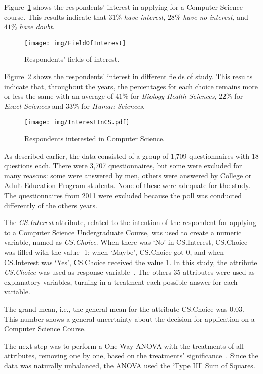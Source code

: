Figure~\ref{fig:FieldOfInterest} shows the respondents' interest in applying for a Computer Science course. This results indicate that $31\%$  \emph{have interest}, $28\%$  \emph{have no interest}, and $41\%$  \emph{have doubt}.

\begin{figure}%
\texttt{[image: img/FieldOfInterest]}%
\caption{Respondents' fields of interest.}%
\label{fig:FieldOfInterest}%
\end{figure}%

Figure~\ref{fig:InterestInCS.pdf} shows the respondents' interest in different fields of study. This results indicate that, throughout the years, the percentages for each choice remains more or less the same with an average of $41\%$ for \emph{Biology-Health Sciences}, $22\%$ for \emph{Exact Sciences} and $33\%$ for \emph{Human Sciences}.

\begin{figure}%
\texttt{[image: img/InterestInCS.pdf]}%
\caption{Respondents interested in Computer Science.}%
\label{fig:InterestInCS.pdf}%
\end{figure}%

As described earlier, the data consisted of a group of 1,709 questionnaires with 18 questions each. There were 3,707 questionnaires, but some were excluded for many reasons: some were answered by men, others were answered by College or Adult Education Program students. None of these were adequate for the study. The questionnaires from 2011 were excluded because the poll was conducted differently of the others years.

The \emph{CS.Interest} attribute, related to the intention of the respondent for applying to a Computer Science Undergraduate Course, was used to create a numeric variable, named as \emph{CS.Choice}. When there was `No' in CS.Interest, CS.Choice was filled with the value -1; when `Maybe', CS.Choice got 0, and when CS.Interest was `Yes', CS.Choice received the value 1. In this study, the attribute \emph{CS.Choice} was used as response variable~\cite{moore2009practice}. The others 35 attributes were used as explanatory variables, turning in a treatment each possible answer for each variable.

The grand mean, i.e., the general mean for the attribute CS.Choice was 0.03. This number shows a general uncertainty about the decision for application on a Computer Science Course. 

The next step was to perform a One-Way ANOVA with the treatments of all attributes, removing one by one, based on the treatments' significance~\cite{Chambers1990}. Since the data was naturally unbalanced, the ANOVA used the `Type III' Sum of Squares. 

